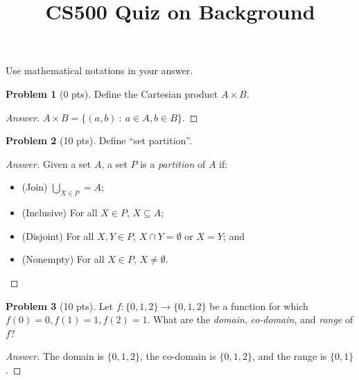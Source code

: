 \documentclass[11pt,a4paper,oneside,microtype,nokorean]{oblivoir}
\theoremstyle{definition}
\newtheorem{problem}{Problem}
\begin{document}
\title{CS500 Quiz on Background}
\maketitle

\noindent Use mathematical notations in your answer.

\begin{problem}[0 pts]
  Define the Cartesian product $A \times B$.
\end{problem}
\begin{proof}[Answer]
  $A \times B = \{(a,b)~:~a \in A, b \in B\}$.
\end{proof}


\begin{problem}[10 pts]
  Define ``set partition''.
\end{problem}
\begin{proof}[Answer]
  Given a set $A$, a set $P$ is a \emph{partition} of $A$ if:
  \begin{itemize}
  \item (Join) $\bigcup_{X \in P} = A$;
  \item (Inclusive) For all $X \in P$, $X \subseteq A$;
  \item (Disjoint) For all $X, Y \in P$, $X \cap Y = \emptyset$ or $X = Y$; and
  \item (Nonempty) For all $X \in P$, $X \neq \emptyset$.
  \end{itemize}
\end{proof}


\begin{problem}[10 pts]
  Let $f: \{0,1,2\} \to \{0,1,2\}$ be a function for which $f(0) = 0, f(1) = 1, f(2) = 1$.  What are
  the \emph{domain}, \emph{co-domain}, and \emph{range} of $f$?
\end{problem}
\begin{proof}[Answer]
  The domain is $\{0,1,2\}$, the co-domain is $\{0,1,2\}$, and the range is $\{0,1\}$.
\end{proof}
\end{document}
